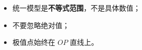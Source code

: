 \begin{trapbox}
\begin{itemize}
  \item 统一模型是\textbf{不等式范围}，不是具体数值；
  \item 不要忽略绝对值；
  \item 极值点始终在 $OP$ 直线上。
\end{itemize}
\end{trapbox}
